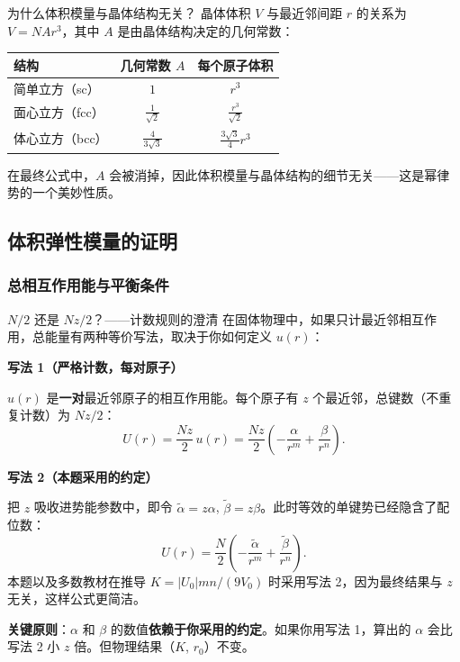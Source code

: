 \begin{insightbox}{为什么体积模量与晶体结构无关？}
晶体体积 $V$ 与最近邻间距 $r$ 的关系为 $V = NAr^3$，其中 $A$ 是由晶体结构决定的几何常数：
\begin{center}
\renewcommand{\arraystretch}{1.4}
\begin{tabular}{|l|c|c|}
\hline
\textbf{结构} & \textbf{几何常数} $A$ & \textbf{每个原子体积} \\
\hline
简单立方（sc） & $1$ & $r^3$ \\
面心立方（fcc） & $\frac{1}{\sqrt{2}}$ & $\frac{r^3}{\sqrt{2}}$ \\
体心立方（bcc） & $\frac{4}{3\sqrt{3}}$ & $\frac{3\sqrt{3}}{4}r^3$ \\
\hline
\end{tabular}
\end{center}

在最终公式中，$A$ 会被消掉，因此体积模量与晶体结构的细节无关——这是幂律势的一个美妙性质。
\end{insightbox}

\subsection{体积弹性模量的证明}

\subsubsection{总相互作用能与平衡条件}

\begin{modelbox}{$N/2$ 还是 $Nz/2$？——计数规则的澄清}
在固体物理中，如果只计最近邻相互作用，总能量有两种等价写法，取决于你如何定义 $u(r)$：

\textbf{写法 1（严格计数，每对原子）}

$u(r)$ 是\textbf{一对}最近邻原子的相互作用能。每个原子有 $z$ 个最近邻，总键数（不重复计数）为 $Nz/2$：
\[
  U(r) = \frac{Nz}{2}\,u(r) = \frac{Nz}{2}\left(-\frac{\alpha}{r^m} + \frac{\beta}{r^n}\right).
\]

\textbf{写法 2（本题采用的约定）}

把 $z$ 吸收进势能参数中，即令 $\tilde{\alpha} = z\alpha$, $\tilde{\beta} = z\beta$。此时等效的单键势已经隐含了配位数：
\[
  U(r) = \frac{N}{2}\left(-\frac{\tilde{\alpha}}{r^m} + \frac{\tilde{\beta}}{r^n}\right).
\]
本题以及多数教材在推导 $K = |U_0|mn/(9V_0)$ 时采用写法 2，因为最终结果与 $z$ 无关，这样公式更简洁。

\textbf{关键原则}：$\alpha$ 和 $\beta$ 的数值\textbf{依赖于你采用的约定}。如果你用写法 1，算出的 $\alpha$ 会比写法 2 小 $z$ 倍。但物理结果（$K$, $r_0$）不变。
\end{modelbox}

